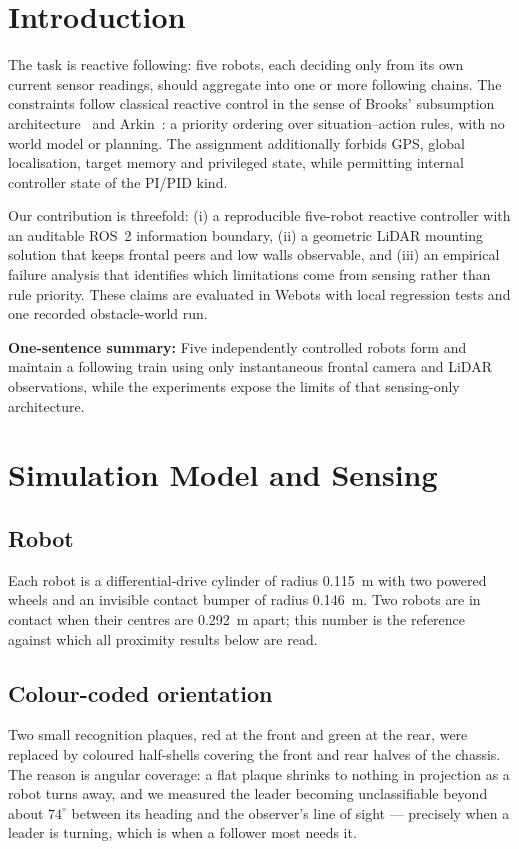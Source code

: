\documentclass[conference,a4paper]{IEEEtran}
\begin{document}
\section{Introduction}
The task is reactive following: five robots, each deciding only from its own
current sensor readings, should aggregate into one or more following chains.
The constraints follow classical reactive control in the sense of Brooks'
subsumption architecture~\cite{brooks1986} and Arkin~\cite{arkin1998}: a
priority ordering over situation--action rules, with no world model or
planning. The assignment additionally forbids GPS, global localisation,
target memory and privileged state, while permitting internal controller
state of the PI/PID kind.

Our contribution is threefold: (i) a reproducible five-robot reactive
controller with an auditable ROS~2 information boundary, (ii) a geometric
LiDAR mounting solution that keeps frontal peers and low walls observable,
and (iii) an empirical failure analysis that identifies which limitations
come from sensing rather than rule priority. These claims are evaluated in
Webots with local regression tests and one recorded obstacle-world run.

\textbf{One-sentence summary:} Five independently controlled robots form and
maintain a following train using only instantaneous frontal camera and LiDAR
observations, while the experiments expose the limits of that sensing-only
architecture.

\section{Simulation Model and Sensing}

\subsection{Robot}
Each robot is a differential-drive cylinder of radius \SI{0.115}{\metre} with
two powered wheels and an invisible contact bumper of radius
\SI{0.146}{\metre}. Two robots are in contact when their centres are
\SI{0.292}{\metre} apart; this number is the reference against which all
proximity results below are read.

\subsection{Colour-coded orientation}
Two small recognition plaques, red at the front and green at the rear, were
replaced by coloured half-shells covering the front and rear halves of the
chassis. The reason is angular coverage: a flat plaque shrinks to nothing in
projection as a robot turns away, and we measured the leader becoming
unclassifiable beyond about $74^\circ$ between its heading and the
observer's line of sight --- precisely when a leader is turning, which is
when a follower most needs it.
\end{document}
